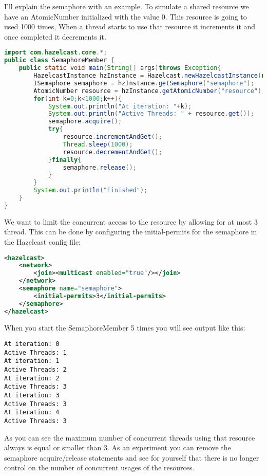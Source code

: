 I'll explain the semaphore with an example. To simulate a shared resource we have an AtomicNumber initialized with the value 0. This resource is going to used 1000 times, When a thread starts to use that resource it increments it and once completed it decrements it.
\begin{lstlisting}[language=java]
import com.hazelcast.core.*;
public class SemaphoreMember {
    public static void main(String[] args)throws Exception{
        HazelcastInstance hzInstance = Hazelcast.newHazelcastInstance(null);
        ISemaphore semaphore = hzInstance.getSemaphore("semaphore");
        AtomicNumber resource = hzInstance.getAtomicNumber("resource");
        for(int k=0;k<1000;k++){
            System.out.println("At iteration: "+k);
            System.out.println("Active Threads: " + resource.get());
            semaphore.acquire();
            try{
                resource.incrementAndGet();
                Thread.sleep(1000);
                resource.decrementAndGet();
            }finally{
                semaphore.release();
            }
        }
        System.out.println("Finished");
    }
}
\end{lstlisting}
We want to limit the concurrent access to the resource by allowing for at most 3 thread. This can be done by configuring the initial-permits for the semaphore in the Hazelcast config file:
\begin{lstlisting}[language=xml]
<hazelcast>
    <network>
        <join><multicast enabled="true"/></join>
    </network>
    <semaphore name="semaphore">
        <initial-permits>3</initial-permits>
    </semaphore>
</hazelcast>
\end{lstlisting}
When you start the SemaphoreMember 5 times you will see output like this:
\begin{lstlisting}
At iteration: 0
Active Threads: 1
At iteration: 1
Active Threads: 2
At iteration: 2
Active Threads: 3
At iteration: 3
Active Threads: 3
At iteration: 4
Active Threads: 3
\end{lstlisting}
As you can see the maximum number of concurrent threads using that resource always is equal or smaller than 3. As an experiment you can remove the semaphore acquire/release statements and see for yourself that there is no longer control on the number of concurrent usages of the resources.

